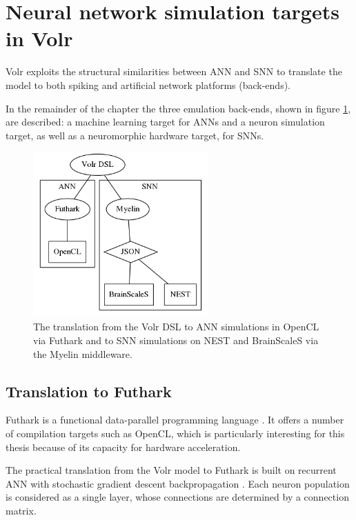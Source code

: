 \section{Neural network simulation targets in Volr} \label{sec:volr-targets}


Volr exploits the structural similarities between \gls{ANN} and \gls{SNN} to
translate the model to both spiking and artificial network platforms (back-ends).

In the remainder of the chapter the three emulation back-ends, shown in figure
\ref{fig:volr}, are described:
a machine learning target for \gls{ANN}s and a neuron simulation target, as well
as a neuromorphic hardware target, for \gls{SNN}s.

\begin{figure}
  \centering
  \includegraphics[width=0.6\textwidth]{images/volr-architecture.png}
  \caption{The translation from the Volr DSL to \gls{ANN} simulations in OpenCL via
    \gls{Futhark} and to \gls{SNN} simulations on \gls{NEST} and \gls{BrainScaleS}
    via the \gls{Myelin} middleware.
  }
  \label{fig:volr}
\end{figure}

\subsection{Translation to Futhark} \label{sec:volr-futhark}
Futhark is a functional data-parallel programming language \autocite{Henriksen2017}.
It offers a number of compilation targets such as \gls{OpenCL}, which is
particularly interesting for this thesis because of its capacity for hardware
acceleration.

The practical translation from the Volr model to Futhark is built on recurrent
\gls{ANN} with stochastic gradient descent backpropagation
\autocite{russel2007, schmidhuber2014}.
Each neuron population is considered as a single layer, whose connections are
determined by a connection matrix.

